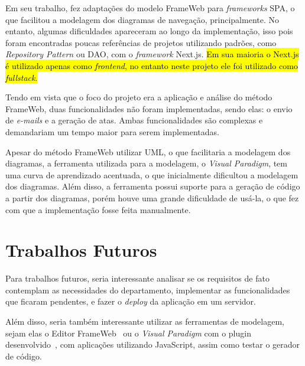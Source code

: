Em seu trabalho,  fez adaptações do modelo FrameWeb para \textit{frameworks} SPA, o que facilitou 
a modelagem dos diagramas de navegação, principalmente. No entanto, algumas dificuldades apareceram ao longo da implementação,
isso pois foram encontradas poucas referências de projetos utilizando padrões, como \textit{Repository Pattern} ou DAO, com o \textit{framework} Next.js.
\hl{Em sua maioria o Next.js é utilizado apenas como \textit{frontend}, no entanto neste projeto ele foi utilizado como \textit{fullstack}.}

Tendo em vista que o foco do projeto era a aplicação e análise do método FrameWeb, duas funcionalidades não foram implementadas,
sendo elas: o envio de \textit{e-mails} e a geração de atas. Ambas funcionalidades são complexas e demandariam um tempo maior para serem implementadas.


Apesar do método FrameWeb utilizar UML, o que facilitaria a modelagem dos diagramas, a ferramenta utilizada para a modelagem, o \textit{Visual Paradigm}, 
tem uma curva de aprendizado acentuada, o que inicialmente dificultou a modelagem dos diagramas. Além disso, a ferramenta possui suporte para a geração de código
a partir dos diagramas, porém houve uma grande dificuldade de usá-la, o que fez com que a implementação fosse feita manualmente.


\section{Trabalhos Futuros}
\label{sec-conclusoes-trabalhosfuturos}


Para trabalhos futuros, seria interessante analisar se os requisitos de fato contemplam as necessidades do departamento,
implementar as funcionalidades que ficaram pendentes, e fazer o \textit{deploy} da aplicação em um servidor.

Além disso, seria também interessante utilizar as ferramentas de modelagem, sejam elas o Editor FrameWeb~\cite{campos:2017} ou o \textit{Visual Paradigm} com o plugin desenvolvido~\cite{silva:2023},
com aplicações utilizando JavaScript, assim como testar o gerador de código.

